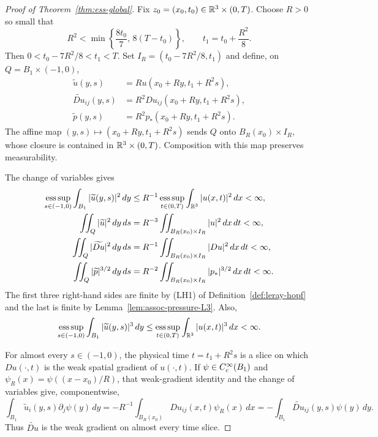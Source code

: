 \documentclass[11pt,letterpaper]{article}
\numberwithin{equation}{section}
\theoremstyle{plain}
\theoremstyle{definition}
\theoremstyle{remark}
\begin{document}
\begin{proof}[Proof of Theorem~\ref{thm:ess-global}]
Fix $z_0=(x_0,t_0)\in\mathbb{R}^3\times(0,T)$. Choose $R>0$ so small that
\[
 R^2<\min\left\{\frac{8t_0}{7},\,8(T-t_0)\right\},
 \qquad t_1=t_0+\frac{R^2}{8}.
\]
Then $0<t_0-7R^2/8<t_1<T$. Set
$I_R=(t_0-7R^2/8,t_1)$ and define, on $Q=B_1\times(-1,0)$,
\begin{align*}
 \widetilde u(y,s)&=R u(x_0+Ry,t_1+R^2s),\\
 \widetilde{Du}_{ij}(y,s)&=R^2Du_{ij}(x_0+Ry,t_1+R^2s),\\
 \widetilde p(y,s)&=R^2p_*(x_0+Ry,t_1+R^2s).
\end{align*}
The affine map $(y,s)\mapsto(x_0+Ry,t_1+R^2s)$ sends $Q$ onto
$B_R(x_0)\times I_R$, whose closure is contained in
$\mathbb{R}^3\times(0,T)$. Composition with this map preserves measurability.

The change of variables gives
\begin{align*}
 \operatorname*{ess\,sup}_{s\in(-1,0)}\int_{B_1}|\widetilde u(y,s)|^2\,dy
 &\le R^{-1}\operatorname*{ess\,sup}_{t\in(0,T)}\int_{\mathbb{R}^3}|u(x,t)|^2\,dx<\infty,\\
 \iint_Q|\widetilde u|^2\,dy\,ds
 &=R^{-3}\iint_{B_R(x_0)\times I_R}|u|^2\,dx\,dt<\infty,\\
 \iint_Q|\widetilde{Du}|^2\,dy\,ds
 &=R^{-1}\iint_{B_R(x_0)\times I_R}|Du|^2\,dx\,dt<\infty,\\
 \iint_Q|\widetilde p|^{3/2}\,dy\,ds
 &=R^{-2}\iint_{B_R(x_0)\times I_R}|p_*|^{3/2}\,dx\,dt<\infty.
\end{align*}
The first three right-hand sides are finite by (LH1) of
Definition~\ref{def:leray-hopf} and the last is finite by
Lemma~\ref{lem:assoc-pressure-L3}. Also,
\[
 \operatorname*{ess\,sup}_{s\in(-1,0)}\int_{B_1}|\widetilde u(y,s)|^3\,dy
 \le \operatorname*{ess\,sup}_{t\in(0,T)}\int_{\mathbb{R}^3}|u(x,t)|^3\,dx<\infty.
\]

For almost every $s\in(-1,0)$, the physical time $t=t_1+R^2s$ is a slice on
which $Du(\cdot,t)$ is the weak spatial gradient of $u(\cdot,t)$. If
$\psi\in C_c^\infty(B_1)$ and $\psi_R(x)=\psi((x-x_0)/R)$, that weak-gradient identity
and the change of variables give, componentwise,
\[
 \int_{B_1}\widetilde u_i(y,s)\partial_j\psi(y)\,dy
 =-R^{-1}\int_{B_R(x_0)}Du_{ij}(x,t)\psi_R(x)\,dx
 =-\int_{B_1}\widetilde{Du}_{ij}(y,s)\psi(y)\,dy.
\]
Thus $\widetilde{Du}$ is the weak gradient on almost every time slice.


\end{proof}
\end{document}
